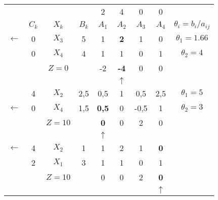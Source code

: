     \begin{tabular}{ccccccccc}
\cline{2-9}            &         &         &         & 2       & 4       & 0       & 0       &  \bigstrut[t]\\
            & $C_k$   & $X_k$   & $B_k$   & $A_1$   & $A_2$   & $A_3$   & $A_4$   & $\theta_i = b_i/a_{ij}$ \bigstrut[b]\\
\cline{2-9}    $\leftarrow$ & 0       & \textcolor[rgb]{ 1,  0,  0}{\boldmath{}\textbf{$X_3$}\unboldmath{}} & 5       & 1       & \textbf{2} & 1       & 0       & \boldmath{}\textbf{$\theta_1 = 1.66$}\unboldmath{} \bigstrut[t]\\
            & 0       & $X_4$   & 4       & 1       & 1       & 0       & 1       & $\theta_2 = 4$ \bigstrut[b]\\
\cline{2-9}            &         & $Z=0$   &         & -2      & \textcolor[rgb]{ 0,  0,  1}{\textbf{-4}} & 0       & 0       &  \bigstrut\\
\cline{2-9}            &         &         &         &         & $\uparrow$ &         &         &  \bigstrut\\
\cline{2-9}            & 4       & $X_2$   & 2,5     & 0,5     & 1       & 0,5     & 2,5     & $\theta_1 = 5$ \bigstrut[t]\\
    $\leftarrow$ & 0       & \textcolor[rgb]{ 1,  0,  0}{\boldmath{}\textbf{$X_4$}\unboldmath{}} & 1,5     & \textbf{0,5} & 0       & -0,5    & 1       & \boldmath{}\textbf{$\theta_2 = 3$}\unboldmath{} \bigstrut[b]\\
\cline{2-9}            &         & $Z=10$  &         & \textcolor[rgb]{ 0,  0,  1}{\textbf{0}} & 0       & 2       & 0       &  \bigstrut\\
\cline{2-9}            &         &         &         & $\uparrow$ &         &         &         &  \bigstrut\\
\cline{2-9}    $\leftarrow$ & 4       & \textcolor[rgb]{ 1,  0,  0}{\boldmath{}\textbf{$X_2$}\unboldmath{}} & 1       & 1       & 2       & 1       & \textbf{0} &  \bigstrut[t]\\
            & 2       & $X_1$   & 3       & 1       & 1       & 0       & 1       &  \bigstrut[b]\\
\cline{2-9}            &         & $Z=10$  &         & 0       & 0       & 2       & \textcolor[rgb]{ 0,  0,  1}{\textbf{0}} &  \bigstrut\\
\cline{2-9}            &         &         &         &         &         &         & $\uparrow$ &  \bigstrut[t]\\
    \end{tabular}%
